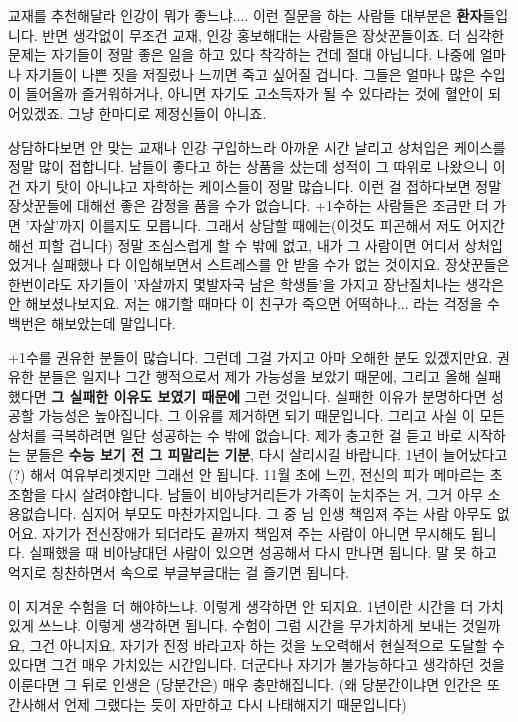 교재를 추천해달라 인강이 뭐가 좋느냐.... 이런 질문을 하는 사람들 대부분은 \textbf{환자}들입니다.
반면 생각없이 무조건 교재, 인강 홍보해대는 사람들은 장삿꾼들이죠.
더 심각한 문제는 자기들이 정말 좋은 일을 하고 있다 착각하는 건데 절대 아닙니다.
나중에 얼마나 자기들이 나쁜 짓을 저질렀나 느끼면 죽고 싶어질 겁니다.
그들은 얼마나 많은 수입이 들어올까 즐거워하거나, 아니면 자기도 고소득자가 될 수 있다라는 것에 혈안이 되어있겠죠.
그냥 한마디로 제정신들이 아니죠.
\vspace{5mm}

상담하다보면 안 맞는 교재나 인강 구입하느라 아까운 시간 날리고 상처입은 케이스를 정말 많이 접합니다.
남들이 좋다고 하는 상품을 샀는데 성적이 그 따위로 나왔으니 이건 자기 탓이 아니냐고 자학하는 케이스들이 정말 많습니다.
이런 걸 접하다보면 정말 장삿꾼들에 대해선 좋은 감정을 품을 수가 없습니다.
+1수하는 사람들은 조금만 더 가면 '자살'까지 이를지도 모릅니다. 그래서 상담할 때에는(이것도 피곤해서 저도 어지간해선 피할 겁니다)
정말 조심스럽게 할 수 밖에 없고, 내가 그 사람이면 어디서 상처입었거나 실패했나 다 이입해보면서 스트레스를 안 받을 수가 없는 것이지요.
장삿꾼들은 한번이라도 자기들이 '자살까지 몇발자국 남은 학생들'을 가지고 장난질치나는 생각은 안 해보셨나보지요.
저는 얘기할 때마다 이 친구가 죽으면 어떡하나... 라는 걱정을 수백번은 해보았는데 말입니다.
\vspace{5mm}

+1수를 권유한 분들이 많습니다. 그런데 그걸 가지고 아마 오해한 분도 있겠지만요.
권유한 분들은 일지나 그간 행적으로서 제가 가능성을 보았기 때문에, 그리고 올해 실패했다면 \textbf{그 실패한 이유도 보였기 때문에} 그런 것입니다.
실패한 이유가 분명하다면 성공할 가능성은 높아집니다. 그 이유를 제거하면 되기 때문입니다.
그리고 사실 이 모든 상처를 극복하려면 일단 성공하는 수 밖에 없습니다.
제가 충고한 걸 듣고 바로 시작하는 분들은 \textbf{수능 보기 전 그 피말리는 기분}, 다시 살리시길 바랍니다.
1년이 늘어났다고(?) 해서 여유부리겟지만 그래선 안 됩니다. 11월 초에 느낀, 전신의 피가 메마르는 초조함을 다시 살려야합니다.
남들이 비아냥거리든가 가족이 눈치주는 거, 그거 아무 소용없습니다. 심지어 부모도 마찬가지입니다.
그 중 님 인생 책임져 주는 사람 아무도 없어요. 자기가 전신장애가 되더라도 끝까지 책임져 주는 사람이 아니면 무시해도 됩니다.
실패했을 때 비아냥대던 사람이 있으면 성공해서 다시 만나면 됩니다. 말 못 하고 억지로 칭찬하면서 속으로 부글부글대는 걸 즐기면 됩니다.
\vspace{5mm}

이 지겨운 수험을 더 해야하느냐. 이렇게 생각하면 안 되지요.
1년이란 시간을 더 가치있게 쓰느냐. 이렇게 생각하면 됩니다.
수험이 그럼 시간을 무가치하게 보내는 것일까요, 그건 아니지요.
자기가 진정 바라고자 하는 것을 노오력해서 현실적으로 도달할 수 있다면 그건 매우 가치있는 시간입니다.
더군다나 자기가 불가능하다고 생각하던 것을 이룬다면 그 뒤로 인생은 (당분간은) 매우 충만해집니다.
(왜 당분간이냐면 인간은 또 간사해서 언제 그랬다는 듯이 자만하고 다시 나태해지기 때문입니다)
\vspace{5mm}


